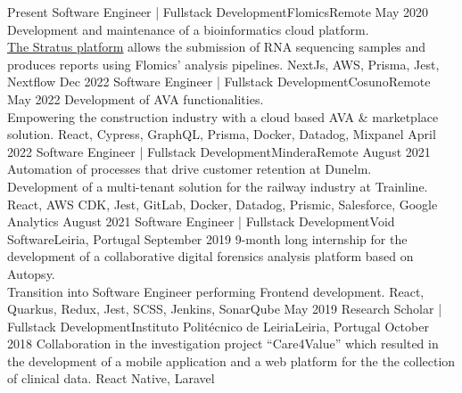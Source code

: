 %
%
%
\vspace{0.5em}
\begin{experiences}
  \experience
  {Present} {Software Engineer | Fullstack Development}{Flomics}{Remote}
  {May 2020}    {Development and maintenance of a bioinformatics cloud platform.\\
    \href{https://cloud.flomics.com}{The Stratus platform} allows the submission of RNA sequencing samples and produces reports using Flomics' analysis pipelines.}
  {NextJs, AWS, Prisma, Jest, Nextflow}
  \emptySeparator
  \experience
  {Dec 2022} {Software Engineer | Fullstack Development}{Cosuno}{Remote}
  {May 2022} {Development of AVA functionalities.\\
    Empowering the construction industry with a cloud based AVA \& marketplace solution.}
  {React, Cypress, GraphQL, Prisma, Docker, Datadog, Mixpanel}
  \emptySeparator
  \experience
  {April 2022}   {Software Engineer | Fullstack Development}{Mindera}{Remote}
  {August 2021} {Automation of processes that drive customer retention at Dunelm.\\
    Development of a multi-tenant solution for the railway industry at Trainline.}
  {React,  AWS CDK, Jest, GitLab, Docker, Datadog, Prismic, Salesforce, Google Analytics}
  \emptySeparator
  \experience
  {August 2021}     {Software Engineer | Fullstack Development}{Void Software}{Leiria, Portugal}
  {September 2019}    {9-month long internship for the development of a collaborative digital forensics analysis
    platform based on Autopsy.\\
    Transition into Software Engineer performing Frontend development.}
  {React, Quarkus, Redux, Jest, SCSS, Jenkins, SonarQube}
  \emptySeparator
  \experience
  {May 2019}     {Research Scholar | Fullstack Development}{Instituto Politécnico de Leiria}{Leiria, Portugal}
  {October 2018}    {Collaboration in the investigation project “Care4Value” which resulted in
    the development of a mobile application and a web platform for the 
    the collection of clinical data.}
  {React Native, Laravel}
\end{experiences}